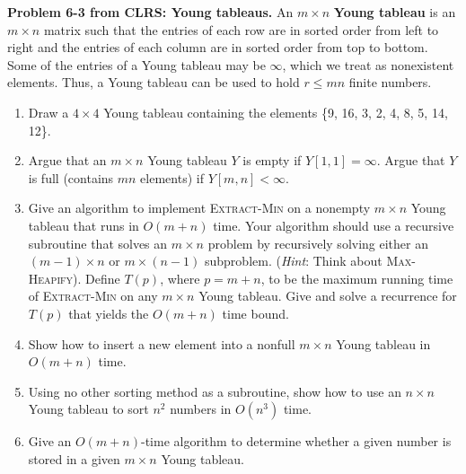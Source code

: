 \documentclass[11pt,letterpaper]{article}
\begin{document}
\noindent
\textbf{Problem 6-3 from CLRS: Young tableaus.}  
An $m\times n$ \textbf{Young tableau} is an $m\times n$
matrix such that the entries of each row are in sorted order
from left to right and the entries of each column are in
sorted order from top to bottom. Some of the entries of a
Young tableau may be $\infty$, which we treat as nonexistent
elements. Thus, a Young tableau can be used to hold $r \leq
mn$ finite numbers.
\begin{enumerate}[label=\alph*),labelindent=0pt]
\item Draw a $4 \times 4$ Young tableau containing the
elements \{9, 16, 3, 2, 4, 8, 5, 14, 12\}.
\item Argue that an $m\times n$ Young tableau $Y$ is empty
if $Y[1,1]=\infty$. Argue that $Y$ is full (contains $mn$
elements) if $Y[m,n] < \infty$.
\item Give an algorithm to implement \textsc{Extract-Min} on
a nonempty $m\times n$ Young tableau that runs in $O(m+n)$
time. Your algorithm should use a recursive subroutine that
solves an $m\times n$ problem by recursively solving either
an $(m-1)\times n$ or $m\times (n-1)$ subproblem.
(\textit{Hint}: Think about \textsc{Max-Heapify}). Define
$T(p)$, where $p=m+n$, to be the maximum running time of
\textsc{Extract-Min} on any $m\times n$ Young tableau. Give
and solve a recurrence for $T(p)$ that yields the $O(m+n)$
time bound.
\item Show how to insert a new element into a nonfull
$m\times n$ Young tableau in $O(m+n)$ time.
\item Using no other sorting method as a subroutine, show
how to use an $n\times n$ Young tableau to sort $n^2$
numbers in $O(n^3)$ time.
\item Give an $O(m+n)$-time algorithm to determine whether a
given number is stored in a given $m\times n$ Young tableau. 
\end{enumerate}
\end{document}
